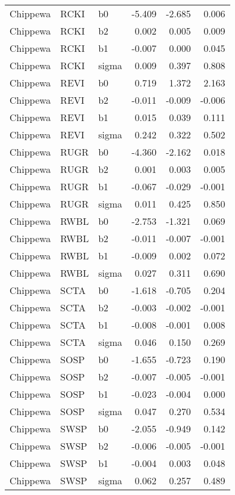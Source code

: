 \begin{table}[ht]
\begin{center}
\begin{tabular}{lllrrr}
  Chippewa & RCKI & b0 & -5.409 & -2.685 & 0.006 \\ 
  Chippewa & RCKI & b2 & 0.002 & 0.005 & 0.009 \\ 
  Chippewa & RCKI & b1 & -0.007 & 0.000 & 0.045 \\ 
  Chippewa & RCKI & sigma & 0.009 & 0.397 & 0.808 \\ 
  Chippewa & REVI & b0 & 0.719 & 1.372 & 2.163 \\ 
  Chippewa & REVI & b2 & -0.011 & -0.009 & -0.006 \\ 
  Chippewa & REVI & b1 & 0.015 & 0.039 & 0.111 \\ 
  Chippewa & REVI & sigma & 0.242 & 0.322 & 0.502 \\ 
  Chippewa & RUGR & b0 & -4.360 & -2.162 & 0.018 \\ 
  Chippewa & RUGR & b2 & 0.001 & 0.003 & 0.005 \\ 
  Chippewa & RUGR & b1 & -0.067 & -0.029 & -0.001 \\ 
  Chippewa & RUGR & sigma & 0.011 & 0.425 & 0.850 \\ 
  Chippewa & RWBL & b0 & -2.753 & -1.321 & 0.069 \\ 
  Chippewa & RWBL & b2 & -0.011 & -0.007 & -0.001 \\ 
  Chippewa & RWBL & b1 & -0.009 & 0.002 & 0.072 \\ 
  Chippewa & RWBL & sigma & 0.027 & 0.311 & 0.690 \\ 
  Chippewa & SCTA & b0 & -1.618 & -0.705 & 0.204 \\ 
  Chippewa & SCTA & b2 & -0.003 & -0.002 & -0.001 \\ 
  Chippewa & SCTA & b1 & -0.008 & -0.001 & 0.008 \\ 
  Chippewa & SCTA & sigma & 0.046 & 0.150 & 0.269 \\ 
  Chippewa & SOSP & b0 & -1.655 & -0.723 & 0.190 \\ 
  Chippewa & SOSP & b2 & -0.007 & -0.005 & -0.001 \\ 
  Chippewa & SOSP & b1 & -0.023 & -0.004 & 0.000 \\ 
  Chippewa & SOSP & sigma & 0.047 & 0.270 & 0.534 \\ 
  Chippewa & SWSP & b0 & -2.055 & -0.949 & 0.142 \\ 
  Chippewa & SWSP & b2 & -0.006 & -0.005 & -0.001 \\ 
  Chippewa & SWSP & b1 & -0.004 & 0.003 & 0.048 \\ 
  Chippewa & SWSP & sigma & 0.062 & 0.257 & 0.489 \\ 

\end{tabular}
\end{center}
\end{table}

